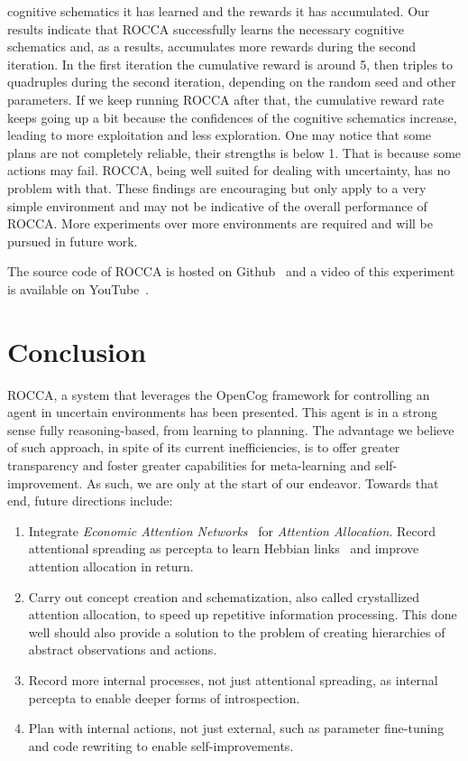 \documentclass[runningheads]{llncs}
\begin{document}
cognitive schematics it has learned and the rewards it has
accumulated.  Our results indicate that ROCCA successfully learns the
necessary cognitive schematics and, as a results, accumulates more
rewards during the second iteration.  In the first iteration the
cumulative reward is around 5, then triples to quadruples during the
second iteration, depending on the random seed and other parameters.
If we keep running ROCCA after that, the cumulative reward rate keeps
going up a bit because the confidences of the cognitive schematics
increase, leading to more exploitation and less exploration.  One may
notice that some plans are not completely reliable, their strengths is
below 1.  That is because some actions may fail.  ROCCA, being well
suited for dealing with uncertainty, has no problem with that.  These
findings are encouraging but only apply to a very simple environment
and may not be indicative of the overall performance of ROCCA.  More
experiments over more environments are required
and will be pursued in future work.

The source code of ROCCA is hosted on Github~\cite{ROCCACode} and a
video of this experiment is available on YouTube~\cite{ROCCADemo}.

\section{Conclusion}
\label{sec:conclusion}
ROCCA, a system that leverages the OpenCog framework for controlling
an agent in uncertain environments has been presented.  This agent is
in a strong sense fully reasoning-based, from learning to planning.
The advantage we believe of such approach, in spite of its current
inefficiencies, is to offer greater transparency and foster greater
capabilities for meta-learning and self-improvement.  As such, we are
only at the start of our endeavor.  Towards that end, future
directions include:
\begin{enumerate}
\item Integrate \emph{Economic Attention Networks}~\cite{Pitt2009} for
  \emph{Attention Allocation}.  Record attentional spreading as
  percepta to learn Hebbian links~\cite{Pitt2009} and improve
  attention allocation in return.
\item Carry out concept creation and schematization, also called
  crystallized attention allocation, to speed up repetitive
  information processing.  This done well should also provide a
  solution to the problem of creating hierarchies of abstract
  observations and actions.
\item Record more internal processes, not just attentional spreading, as
  internal percepta to enable deeper forms of introspection.
\item Plan with internal actions, not just external, such as parameter
  fine-tuning and code rewriting to enable self-improvements.
\end{enumerate}
\end{document}
